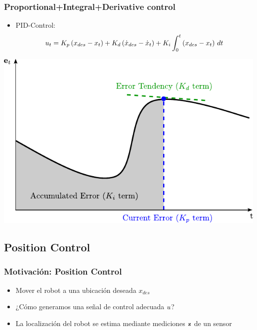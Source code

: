 \begin{frame}
    \frametitle{Proportional+Integral+Derivative control}
    
    \begin{itemize}
        \item PID-Control:
        \begin{equation*}
            u_{t} = K_{p} \left(x_{des} - x_{t}\right) + K_{d} \left(\dot{x}_{des} - \dot{x}_{t} \right) + K_{i} \int_{0}^{t} \left( x_{des} - x_{t}\right) \, dt
        \end{equation*}
    \end{itemize}
    
    \begin{center}
        \includegraphics[width=0.6\columnwidth]{images/pid_control_error.pdf}
    \end{center}
    
    
    
\end{frame}

\subsection{Position Control}

\begin{frame}
    \frametitle{Motivación: Position Control}
    
    \begin{itemize}
        \item Mover el robot a una ubicación deseada $x_{des}$
        \item ¿Cómo generamos una señal de control adecuada $u$?
        \item La localización del robot se estima mediante mediciones $\boldsymbol{\mathbf{z}}$ de un sensor
    \end{itemize}
    
\end{frame}

